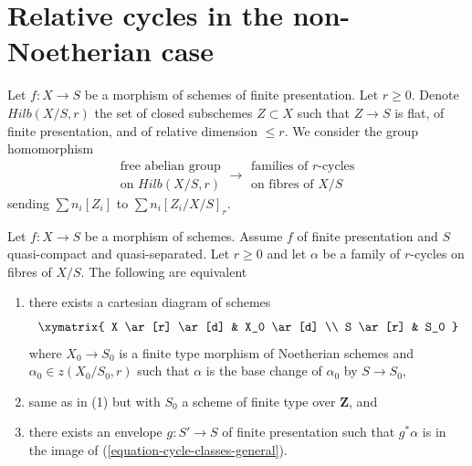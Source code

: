 \section{Relative cycles in the non-Noetherian case}
\label{section-non-noetherian}

\noindent
Let $f : X \to S$ be a morphism of schemes of finite presentation.
Let $r \geq 0$. Denote $Hilb(X/S, r)$ the set of closed subschemes
$Z \subset X$ such that $Z \to S$ is flat, of finite presentation,
and of relative dimension $\leq r$. We consider the group homomorphism
\begin{equation}
\label{equation-cycle-classes-general}
\begin{matrix}
\text{free abelian group} \\
\text{on }Hilb(X/S, r)
\end{matrix}
\longrightarrow
\begin{matrix}
\text{families of }r\text{-cycles}\\
\text{on fibres of }X/S
\end{matrix}
\end{equation}
sending $\sum n_i[Z_i]$ to $\sum n_i[Z_i/X/S]_r$.

\begin{lemma}
\label{lemma-relative-r-cycle-general}
Let $f : X \to S$ be a morphism of schemes. Assume $f$ of finite presentation
and $S$ quasi-compact and quasi-separated.
Let $r \geq 0$ and let $\alpha$ be a family of $r$-cycles on fibres of $X/S$.
The following are equivalent
\begin{enumerate}
\item there exists a cartesian diagram of schemes
$$
\xymatrix{
X \ar[r] \ar[d] & X_0 \ar[d] \\
S \ar[r] & S_0
}
$$
where $X_0 \to S_0$ is a finite type morphism of Noetherian schemes
and $\alpha_0 \in z(X_0/S_0, r)$ such that $\alpha$ is the base change
of $\alpha_0$ by $S \to S_0$,
\item same as in (1) but with $S_0$ a
scheme of finite type over $\mathbf{Z}$, and
\item there exists an envelope $g : S' \to S$
of finite presentation such that $g^*\alpha$ is in the image of
(\ref{equation-cycle-classes-general}).
\end{enumerate}
\end{lemma}

